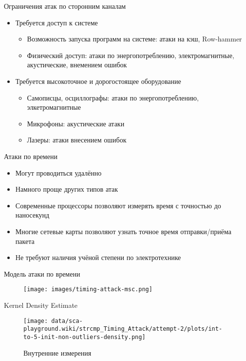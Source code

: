 \documentclass[14pt]{beamer}
\begin{document}
\begin{frame}{Ограничения атак по сторонним каналам}
    \begin{itemize}
        \item Требуется доступ к системе
            \begin{itemize}
                \item Возможность запуска программ на системе: атаки на кэш, Row-hammer
                \item Физический доступ: атаки по энергопотреблению, электромагнитные, акустические, внемением ошибок
            \end{itemize}
        \item Требуется высокоточное и дорогостоящее оборудование
            \begin{itemize}
                \item Самописцы, осциллографы: атаки по энергопотреблению, элкетромагнитные
                \item Микрофоны: акустические атаки
                \item Лазеры: атаки внесением ошибок
            \end{itemize}
    \end{itemize}
\end{frame}

\begin{frame}{Атаки по времени}
    \begin{itemize}
        \item Могут проводиться удалённо
        \item Намного проще других типов атак
        \item Современные процессоры позволяют измерять время с точностью до наносекунд
        \item Многие сетевые карты позволяют узнать точное время отправки/приёма пакета
        \item Не требуют наличия учёной степени по электротехнике
    \end{itemize}
\end{frame}

\begin{frame}{Модель атаки по времени}
    \begin{figure}
        \centering
        \texttt{[image: images/timing-attack-msc.png]}
    \end{figure}
\end{frame}

\begin{frame}{Kernel Density Estimate}
    \begin{figure}
        \centering
        \texttt{[image: data/sca-playground.wiki/strcmp\_Timing\_Attack/attempt-2/plots/int-to-5-init-non-outliers-density.png]}
        \caption{Внутренние измерения}
    \end{figure}
\end{frame}
\end{document}
